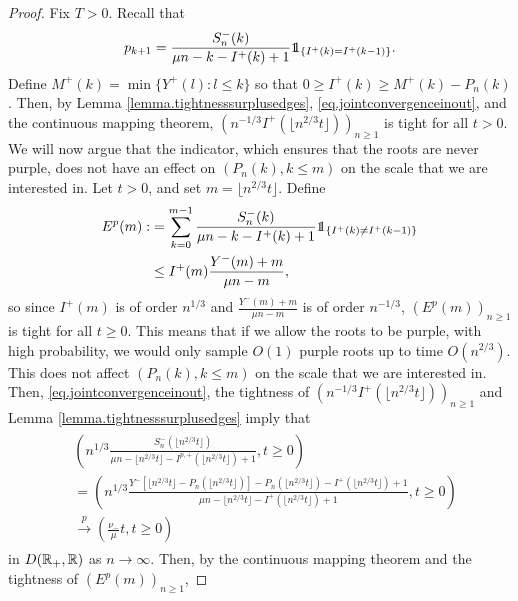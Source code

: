 \begin{proof}
Fix $T>0$. Recall that
$$p_{k+1}=\frac{S_n^{-}(k)}{\mu n - k -I^{+}(k)+1}\one_{\{I^{+}(k)=I^{+}(k-1)\}}.$$
Define $M^+(k)=\min\{Y^+(l):l\leq k\}$ so that $0\geq I^{+}(k)\geq M^+(k)-P_n(k)$.  Then, by Lemma \ref{lemma.tightnesssurplusedges}, \eqref{eq.jointconvergenceinout}, and the continuous mapping theorem, $\left(n^{-1/3}I^+(\lfloor n^{2/3} t \rfloor)\right)_{n\geq 1}$ is tight for all $t>0$.
We will now argue that the indicator, which ensures that the roots are never purple, does not have an effect on $(P_n(k),k\leq m)$ on the scale that we are interested in. Let $t>0$, and set $m=\lfloor n^{2/3}t\rfloor$. Define
\begin{align*}\begin{split}
E^p(m):&=\sum_{k=0}^{m-1}\frac{S_n^{-}(k)}{\mu n - k -I^{+}(k)+1}\one_{\{I^{+}(k)\neq I^{+}(k-1)\}}\\
&\leq I^{+}(m) \frac{Y^-(m)+m}{\mu n - m},\end{split}\end{align*}
so since $I^{+}(m)$ is of order $n^{1/3}$ and $\frac{Y^{-}(m)+m}{\mu n - m}$ is of order $n^{-1/3}$, $(E^p(m))_{n\geq 1}$ is tight for all $t\geq 0$.  This means that if we allow the roots to be purple, with high probability, we would only sample $O(1)$ purple roots up to time $O(n^{2/3})$. This does not affect $(P_n(k),k\leq m)$ on the scale that we are interested in. \\
 Then, \eqref{eq.jointconvergenceinout}, the tightness of $\left(n^{-1/3}I^{+}(\lfloor n^{2/3} t \rfloor)\right)_{n\geq 1}$ and Lemma \ref{lemma.tightnesssurplusedges} imply that
\begin{align}\begin{split}\label{eq.convergenceprob}
  &\left(n^{1/3}\frac{S_n^{-}\left(\lfloor n^{2/3} t \rfloor\right)}{\mu n - \lfloor n^{2/3} t \rfloor -I^{p,+}\left(\lfloor n^{2/3} t \rfloor\right)+1},t\geq 0\right)\\
 &=\left(n^{1/3}\frac{Y^-\left[\lfloor n^{2/3} t \rfloor-P_n\left(\lfloor n^{2/3} t \rfloor\right)\right]-P_n\left(\lfloor n^{2/3} t \rfloor\right)-I^{+}\left(\lfloor n^{2/3} t \rfloor\right)+1}{\mu n - \lfloor n^{2/3} t \rfloor -I^{+}\left(\lfloor n^{2/3} t \rfloor\right)+1},t\geq 0\right)\\
 &\overset{p}{\to} \left(\frac{\nu_-}{\mu}t,t\geq 0\right)\end{split}\end{align}
in $D({\mathbb R}_+,{\mathbb R})$ as $n\to \infty$. 
Then, by the continuous mapping theorem and the tightness of $(E^p(m))_{n\geq 1}$,

\end{proof}
